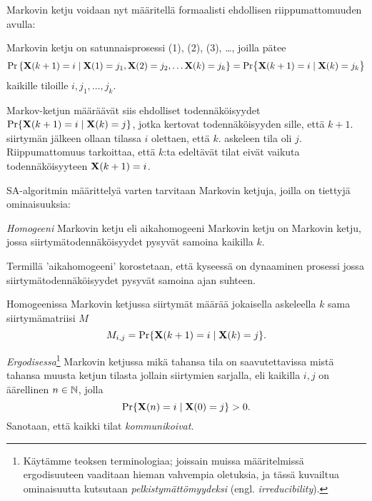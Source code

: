 Markovin ketju voidaan nyt määritellä formaalisti ehdollisen riippumattomuuden avulla:
\begin{maar}
    Markovin ketju on satunnaisprosessi (1), (2), (3), \dots, joilla pätee
    \begin{equation}
        \Pr\left\{\mathbf{X}(k+1) = i \mid \mathbf{X}(1) = j_1, \mathbf{X}(2) = j_2, \dots \mathbf{X}(k) = j_k \right\}
        = \Pr\bigr\{\mathbf{X}(k+1) = i \mid \mathbf{X}(k) = j_k \bigr\}
    \end{equation}
    kaikille tiloille $i, j_1, \dots, j_k$.
\end{maar}

Markov-ketjun määräävät siis ehdolliset todennäköisyydet $\Pr\{\mathbf{X}(k+1) = i \mid \mathbf{X}(k) = j\}$,
jotka kertovat todennäköisyyden sille, että $k+1$. siirtymän jälkeen ollaan tilassa $i$ olettaen, että $k$. askeleen tila oli $j$.
Riippumattomuus tarkoittaa, että $k$:ta edeltävät tilat eivät vaikuta todennäköisyyteen $\mathbf{X}(k+1) = i$.

SA-algoritmin määrittelyä varten tarvitaan Markovin ketjuja, joilla on tiettyjä ominaisuuksia:

\begin{maar}
    \emph{Homogeeni} Markovin ketju eli aikahomogeeni Markovin ketju on Markovin ketju, jossa siirtymätodennäköisyydet pysyvät samoina kaikilla $k$.
\end{maar}
Termillä 'aikahomogeeni' korostetaan, että kyseessä on dynaaminen prosessi jossa siirtymätodennäköisyydet pysyvät samoina ajan suhteen.

Homogeenissa Markovin ketjussa siirtymät määrää jokaisella askeleella $k$ sama siirtymämatriisi $M$
\begin{equation}
    M_{i,j} = \Pr\{\mathbf{X}(k+1) = i \mid \mathbf{X}(k) = j\}.
\end{equation}

\begin{maar}
    \label{maar:ergodisuus}
    \emph{Ergodisessa}\footnote{Käytämme teoksen \cite{salamonetal} terminologiaa; joissain muissa määritelmissä ergodisuuteen vaaditaan hieman vahvempia oletuksia, ja tässä kuvailtua ominaisuutta kutsutaan \emph{pelkistymättömyydeksi} (engl. \emph{irreducibility}).} Markovin ketjussa mikä tahansa tila on saavutettavissa mistä tahansa muusta ketjun tilasta jollain siirtymien sarjalla, eli kaikilla $i,j$ on äärellinen $n \in \mathbb{N}$, jolla
    \begin{equation}
        \Pr\{\mathbf{X}(n) = i \mid \mathbf{X}(0) = j\} > 0.
    \end{equation}
    Sanotaan, että kaikki tilat \emph{kommunikoivat}.
\end{maar}


